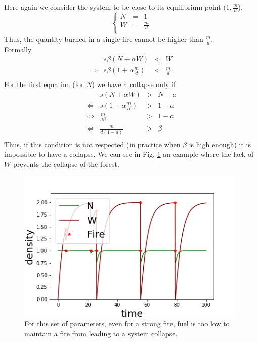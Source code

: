 \documentclass{article}
\begin{document}
Here again we consider the system to be close to its equilibrium point $(1, \frac{m}{d}$).
\[
\left\lbrace
\begin{array}{rcl}
     N & = & 1 \\
     W & = & \frac{m}{d} \\
\end{array}
\right.
\]
Thus, the quantity burned in a single fire cannot be higher than $\frac{m}{d}$. \\
Formally,
\[
\begin{array}{crcl}
&s\beta(N+\alpha W) & < & W \\
\Rightarrow & s\beta(1+\alpha \frac{m}{d}) & < & \frac{m}{d} \\
\end{array}
\]
For the first equation (for $N$) we have a collapse only if
\[
\begin{array}{rccl}
                &  s(N+\alpha W) & > & N-a \\
\Leftrightarrow &  s(1+\alpha \frac{m}{d}) & > & 1-a \\ 
\Leftrightarrow &  \frac{m}{d\beta} & > & 1-a \\ 
\Leftrightarrow &  \frac{m}{d( 1-a)} & > & \beta \\ 
\end{array}
\]
Thus, if this condition is not respected (in practice when $\beta$ is high enough) it is impossible to have a collapse. We can see in Fig. \ref{fig:nevercollapse} an example where the lack of $W$ prevents the collapse of the forest.

\begin{figure}[h!]
\centering
\includegraphics[width=11cm]{return_never_1.png}
\caption{For this set of parameters, even for a strong fire, fuel is too low to maintain a fire from leading to a system collapse.}
\label{fig:nevercollapse}
\end{figure}
\end{document}
